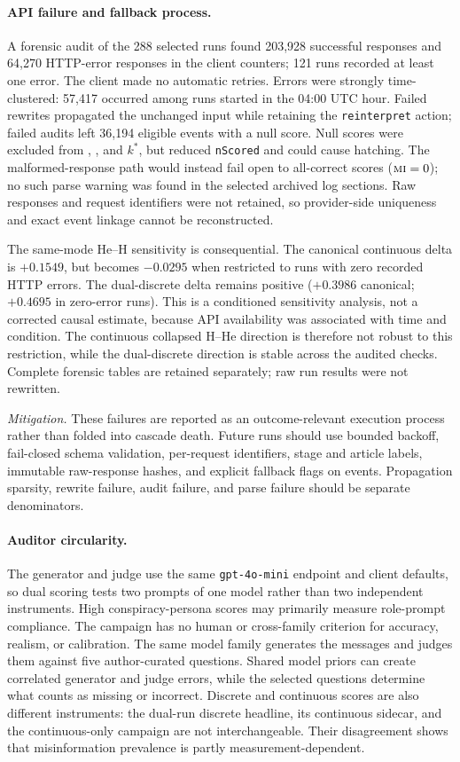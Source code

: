 \paragraph{API failure and fallback process.}
A forensic audit of the 288 selected runs found 203,928 successful responses
and 64,270 HTTP-error responses in the client counters; 121 runs recorded at
least one error.  The client made no automatic retries.  Errors were strongly
time-clustered: 57,417 occurred among runs started in the 04:00 UTC hour.
Failed rewrites propagated the unchanged input while retaining the
\texttt{reinterpret} action; failed audits left 36,194 eligible events with a
null score.  Null scores were excluded from \MI{}, \MPR{}, and \(k^{\ast}\),
but reduced \texttt{nScored} and could cause hatching.  The malformed-response
path would instead fail open to all-correct scores (\(\textsc{mi}=0\)); no such parse
warning was found in the selected archived log sections.  Raw responses and
request identifiers were not retained, so provider-side uniqueness and exact
event linkage cannot be reconstructed.

The same-mode He--H sensitivity is consequential.  The canonical continuous
delta is \(+0.1549\), but becomes \(-0.0295\) when restricted to runs with
zero recorded HTTP errors.  The dual-discrete delta remains positive
(\(+0.3986\) canonical; \(+0.4695\) in zero-error runs).  This is a
conditioned sensitivity analysis, not a corrected causal estimate, because
API availability was associated with time and condition.  The continuous
collapsed H--He direction is therefore not robust to this restriction, while
the dual-discrete direction is stable across the audited checks.  Complete
forensic tables are retained separately; raw run results were not rewritten.

\emph{Mitigation.}  These failures are reported as an outcome-relevant
execution process rather than folded into cascade death.  Future runs should
use bounded backoff, fail-closed schema validation, per-request identifiers,
stage and article labels, immutable raw-response hashes, and explicit
fallback flags on events.  Propagation sparsity, rewrite failure, audit
failure, and parse failure should be separate denominators.

\paragraph{Auditor circularity.}
The generator and judge use the same \texttt{gpt-4o-mini} endpoint and client
defaults, so dual scoring tests two prompts of one model rather than two
independent instruments. High conspiracy-persona scores may primarily measure
role-prompt compliance. The campaign has no human or cross-family criterion
for accuracy, realism, or calibration. The same model family generates the
messages and judges them against five author-curated questions.  Shared model priors can create correlated generator
and judge errors, while the selected questions determine what counts as
missing or incorrect.  Discrete and continuous scores are also different
instruments: the dual-run discrete headline, its continuous sidecar, and the
continuous-only campaign are not interchangeable.  Their disagreement shows
that misinformation prevalence is partly measurement-dependent.

